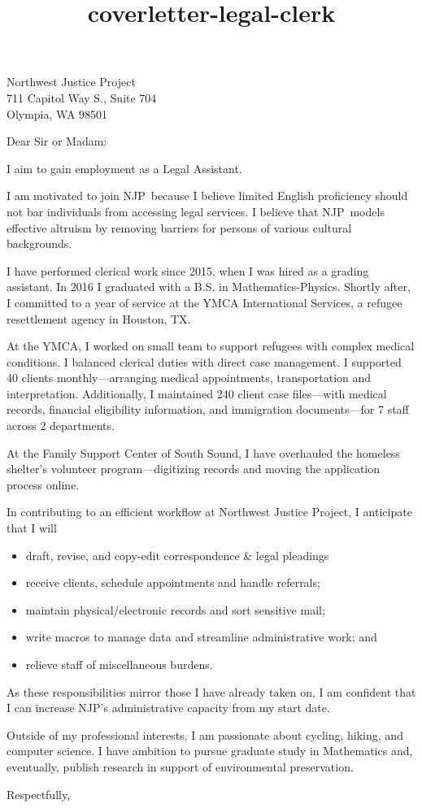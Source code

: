 \documentclass{letter}
\title{coverletter-legal-clerk}
\newcommand{\jobtitle}{a Legal Assistant}
\newcommand{\company}{Northwest Justice Project}
\newcommand{\shortcompany}{NJP}
\begin{document}
\begin{letter}{Northwest Justice Project\\ 711 Capitol Way S., Suite 704\\ Olympia, WA 98501}
\opening{Dear Sir or Madam:}

I aim to gain employment as \jobtitle.

I am motivated to join \shortcompany\ because I believe limited English proficiency should not bar individuals from accessing legal services. I believe that \shortcompany\ models effective altruism by removing barriers for persons of various cultural backgrounds. 

I have performed clerical work since 2015, when I was hired as a grading assistant. %
In 2016 I graduated with a B.S. in Mathematics-Physics. Shortly after, I committed to a year of service at the YMCA International Services, a refugee resettlement agency in Houston, TX. 

At the YMCA, I worked on small team to support refugees with complex medical conditions. I balanced clerical duties with direct case management. I supported 40 clients monthly---arranging medical appointments, transportation and interpretation. %
Additionally, I maintained 240 client case files---with medical records, financial eligibility information, and immigration documents---for 7 staff across 2 departments. 

At the Family Support Center of South Sound, I have overhauled the homeless shelter's volunteer program---digitizing records and moving the application process online. 

In contributing to an efficient workflow at \company, I anticipate that I will
\begin{itemize}
	\item draft, revise, and copy-edit correspondence \& legal pleadings
	\item receive clients, schedule appointments and handle referrals;
	\item maintain physical/electronic records and sort sensitive mail;
	\item write macros to manage data and streamline administrative work; and
	\item relieve staff of miscellaneous burdens.
\end{itemize}
As these responsibilities mirror those I have already taken on, I am confident that I can increase \shortcompany's administrative capacity from my start date.

Outside of my professional interests, I am passionate about cycling, hiking, and computer science. I have ambition to pursue graduate study in Mathematics and, eventually, publish research in support of environmental preservation. 

\closing{Respectfully,}

\end{letter}
\end{document}
